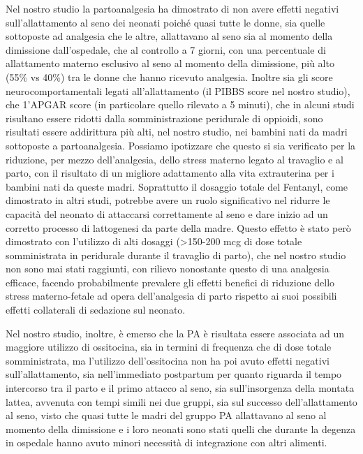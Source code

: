 \documentclass[]{article}
\begin{document}
Nel nostro studio la partoanalgesia ha dimostrato di non avere effetti
negativi sull'allattamento al seno dei neonati poiché quasi tutte le
donne, sia quelle sottoposte ad analgesia che le altre, allattavano al
seno sia al momento della dimissione dall'ospedale, che al controllo a 7
giorni, con una percentuale di allattamento materno esclusivo al seno al
momento della dimissione, più alto (55\% vs 40\%) tra le donne che hanno
ricevuto analgesia. Inoltre sia gli score neurocomportamentali legati
all'allattamento (il PIBBS score nel nostro studio), che 1'APGAR score
(in particolare quello rilevato a 5 minuti), che in alcuni studi
risultano essere ridotti dalla somministrazione peridurale di oppioidi,
sono risultati essere addirittura più alti, nel nostro studio, nei
bambini nati da madri sottoposte a partoanalgesia. Possiamo ipotizzare
che questo si sia verificato per la riduzione, per mezzo dell'analgesia,
dello stress materno legato al travaglio e al parto, con il risultato di
un migliore adattamento alla vita extrauterina per i bambini nati da
queste madri. Soprattutto il dosaggio totale del Fentanyl, come
dimostrato in altri studi, potrebbe avere un ruolo significativo nel
ridurre le capacità del neonato di attaccarsi correttamente al seno e
dare inizio ad un corretto processo di lattogenesi da parte della madre.
Questo effetto è stato però dimostrato con l'utilizzo di alti dosaggi
(\textgreater{}150-200 mcg di dose totale somministrata in peridurale
durante il travaglio di parto), che nel nostro studio non sono mai stati
raggiunti, con rilievo nonostante questo di una analgesia efficace,
facendo probabilmente prevalere gli effetti benefici di riduzione dello
stress materno-fetale ad opera dell'analgesia di parto rispetto ai suoi
possibili effetti collaterali di sedazione sul neonato.

Nel nostro studio, inoltre, è emerso che la PA è risultata essere
associata ad un maggiore utilizzo di ossitocina, sia in termini di
frequenza che di dose totale somministrata, ma l'utilizzo
dell'ossitocina non ha poi avuto effetti negativi sull'allattamento, sia
nell'immediato postpartum per quanto riguarda il tempo intercorso tra il
parto e il primo attacco al seno, sia sull'insorgenza della montata
lattea, avvenuta con tempi simili nei due gruppi, sia sul successo
dell'allattamento al seno, visto che quasi tutte le madri del gruppo PA
allattavano al seno al momento della dimissione e i loro neonati sono
stati quelli che durante la degenza in ospedale hanno avuto minori
necessità di integrazione con altri alimenti.
\end{document}
